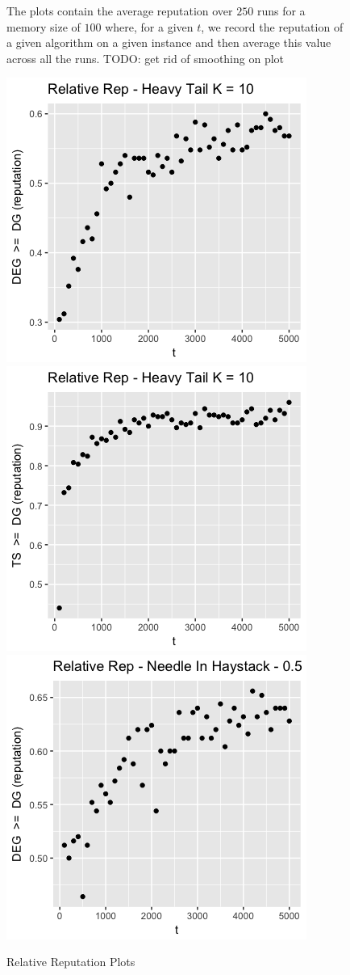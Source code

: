 \documentclass{article}
\theoremstyle{definition}
\begin{document}
\begin{figure}
\label{prelim_means}
\caption*{\tiny{The plots contain the average reputation over $250$ runs for a memory size of $100$ where, for a given $t$, we record the reputation of a given algorithm on a given instance and then average this value across all the runs. TODO: get rid of smoothing on plot}}
\end{figure}

\begin{figure}
\caption{Relative Reputation Plots}
\includegraphics[scale=0.25]{"figures/deg_dg_ht_10_prelim"}
\includegraphics[scale=0.25]{"figures/ts_dg_ht_10_prelim"} \\
\includegraphics[scale=0.25]{"figures/deg_dg_nih_10_prelim"}

\end{figure}
\end{document}
